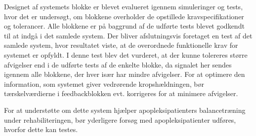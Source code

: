Designet af systemets blokke er blevet evalueret igennem simuleringer og tests, hvor det er undersøgt, om blokkene overholder de opstillede kravspecifikationer og tolerancer. Alle blokkene er på baggrund af de udførte tests blevet godkendt til at indgå i det samlede system. Der bliver afslutningsvis foretaget en test af det samlede system, hvor resultatet viste, at de overordnede funktionelle krav for systemet er opfyldt. I denne test blev det vurderet, at der kunne tolereres større afvigelser end i de udførte tests af de enkelte blokke, da signalet her sendes igennem alle blokkene, der hver især har mindre afvigelser. For at optimere den information, som systemet giver vedrørende kropshældningen, bør tærskelværdierne i feedbackblokken evt. korrigeres for at minimere afvigelser.  

For at understøtte om dette system hjælper apopleksipatienters balancetræning under rehabiliteringen, bør yderligere forsøg med apopleksipatienter udføres, hvorfor dette kan testes.


\clearpage